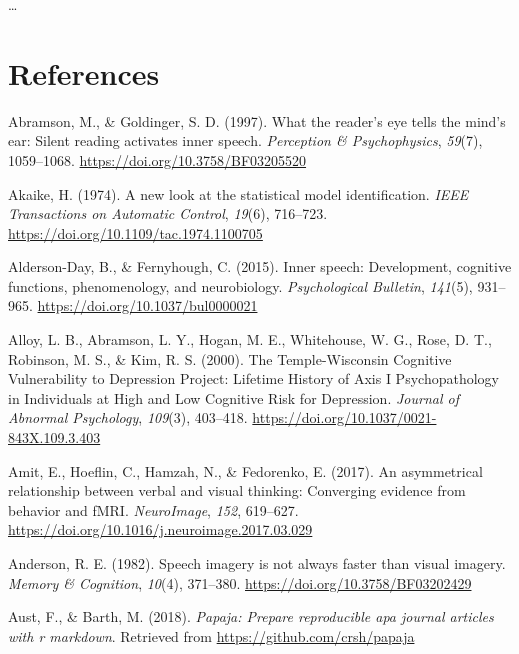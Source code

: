 \documentclass[a4paper,12pt,twoside,openright,oldfontcommands]{memoir}
\begin{document}
\ldots{}

\hypertarget{references}{%
\chapter*{References}\label{references}}

\noindent
\setlength{\parindent}{-0.20in}
\setlength{\leftskip}{0.20in}
\setlength{\parskip}{8pt}

\hypertarget{refs}{}
\leavevmode\hypertarget{ref-abramson_what_1997}{}%
Abramson, M., \& Goldinger, S. D. (1997). What the reader's eye tells the mind's ear: Silent reading activates inner speech. \emph{Perception \& Psychophysics}, \emph{59}(7), 1059--1068. \url{https://doi.org/10.3758/BF03205520}

\leavevmode\hypertarget{ref-akaike_new_1974}{}%
Akaike, H. (1974). A new look at the statistical model identification. \emph{IEEE Transactions on Automatic Control}, \emph{19}(6), 716--723. \url{https://doi.org/10.1109/tac.1974.1100705}

\leavevmode\hypertarget{ref-alderson-day_inner_2015}{}%
Alderson-Day, B., \& Fernyhough, C. (2015). Inner speech: Development, cognitive functions, phenomenology, and neurobiology. \emph{Psychological Bulletin}, \emph{141}(5), 931--965. \url{https://doi.org/10.1037/bul0000021}

\leavevmode\hypertarget{ref-alloy_temple-wisconsin_2000}{}%
Alloy, L. B., Abramson, L. Y., Hogan, M. E., Whitehouse, W. G., Rose, D. T., Robinson, M. S., \& Kim, R. S. (2000). The Temple-Wisconsin Cognitive Vulnerability to Depression Project: Lifetime History of Axis I Psychopathology in Individuals at High and Low Cognitive Risk for Depression. \emph{Journal of Abnormal Psychology}, \emph{109}(3), 403--418. \url{https://doi.org/10.1037/0021-843X.109.3.403}

\leavevmode\hypertarget{ref-amit_asymmetrical_2017}{}%
Amit, E., Hoeflin, C., Hamzah, N., \& Fedorenko, E. (2017). An asymmetrical relationship between verbal and visual thinking: Converging evidence from behavior and fMRI. \emph{NeuroImage}, \emph{152}, 619--627. \url{https://doi.org/10.1016/j.neuroimage.2017.03.029}

\leavevmode\hypertarget{ref-anderson_speech_1982}{}%
Anderson, R. E. (1982). Speech imagery is not always faster than visual imagery. \emph{Memory \& Cognition}, \emph{10}(4), 371--380. \url{https://doi.org/10.3758/BF03202429}

\leavevmode\hypertarget{ref-R-papaja}{}%
Aust, F., \& Barth, M. (2018). \emph{Papaja: Prepare reproducible apa journal articles with r markdown}. Retrieved from \url{https://github.com/crsh/papaja}
\end{document}
